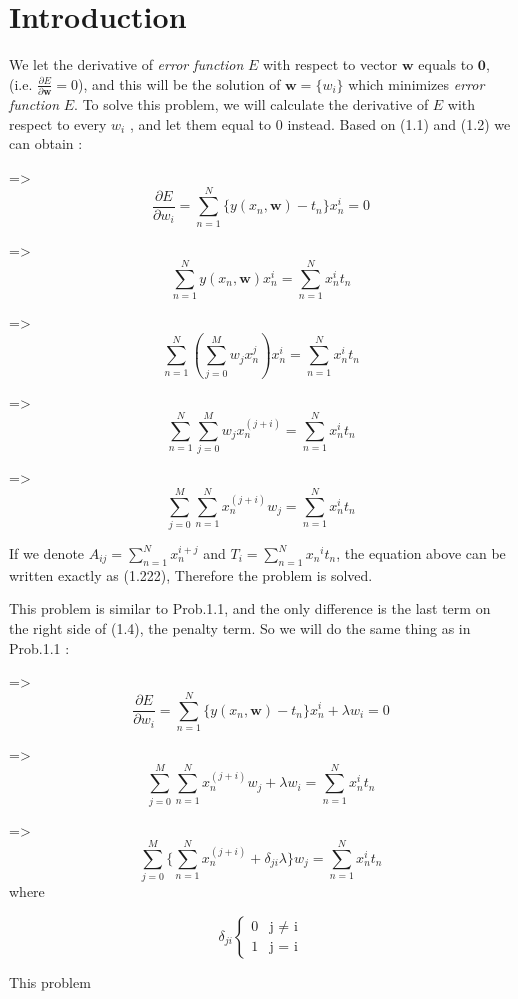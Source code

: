 \section{Introduction}
\vspace{1\baselineskip}
\par
We let the derivative of \emph{error function} $E$ with respect to vector $\mathbf{w}$ equals to $\mathbf{0}$, (i.e. $\frac{\partial{E}}{\partial{\mathbf{w}}}=0$), and this will be the solution of $\mathbf{w}=\{w_i\}$ which minimizes \emph{error function} $E$. To solve this problem, we will calculate the derivative of $E$ with respect to every $w_i$ , and let them equal to $0$ instead. Based on (1.1) and (1.2) we can obtain :
\vspace{0.5\baselineskip}

=>$$\frac{\partial{E}}{\partial{w_i}}=\sum_{n=1}^N {\{y(x_n,\mathbf{w})-t_n\}x_n^i=0}$$

=> $$\sum_{n=1}^N {y(x_n,\mathbf{w})x_n^i} = \sum_{n=1}^N {x_n^i{t_n}} $$ 

=> $$\sum_{n=1}^N {(\sum_{j=0}^M {w_j x_n^j})}x_n^i=\sum_{n=1}^N {x_n^i{t_n}}$$

=> $$\sum_{n=1}^N {\sum_{j=0}^M {w_j x_n^{(j+i)}}=\sum_{n=1}^N {x_n^i{t_n}}}$$

=>$$ \sum_{j=0}^M {\sum_{n=1}^N {x_n^{(j+i)} w_j}=\sum_{n=1}^N {x_n^i{t_n}}}$$

\par
If we denote $A_{ij}=\sum_{n=1}^N {x_n^{i+j}}$ and $T_i=\sum_{n=1}^N {{x_n}^i t_n}$, the equation above can be written exactly as (1.222), Therefore the problem is solved.\\

\par
This problem is similar to Prob.1.1, and the only difference is the last term on the right side of (1.4), the penalty term. So we will do the same thing as in Prob.1.1 : 
\vspace{0.5\baselineskip}

=>$$\frac{\partial{E}}{\partial{w_i}}=\sum_{n=1}^N {\{y(x_n,\mathbf{w})-t_n\}x_n^i+\lambda w_i=0}$$

=>$$ \sum_{j=0}^M {\sum_{n=1}^N {x_n^{(j+i)} w_j}+ \lambda w_i=\sum_{n=1}^N {x_n^i{t_n}}}$$

=>$$ \sum_{j=0}^M {\{\sum_{n=1}^N {x_n^{(j+i)}+\delta_{ji}\lambda\} w_j}=\sum_{n=1}^N {x_n^i{t_n}}}$$
where

$$\delta_{ji}
\begin{cases}
0& \text{j $\ne$ i}\\
1& \text{j = i}
\end{cases}$$

\par
This problem



